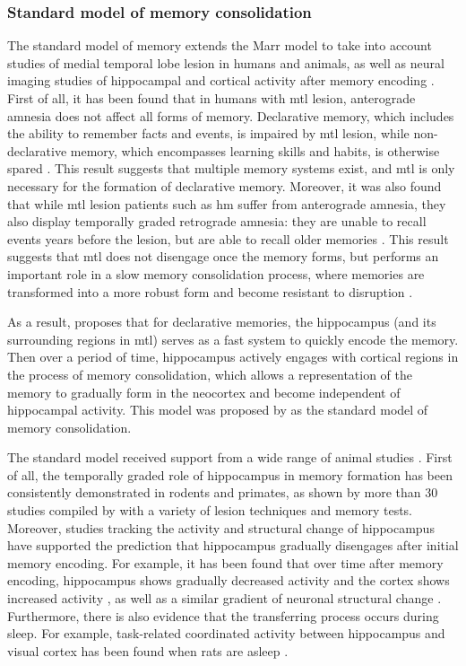 \subsubsection{Standard model of memory consolidation \label{hpc-squire}}
The standard model of memory extends the Marr model to take into account studies of medial temporal lobe lesion in humans and animals, as well as neural imaging studies of hippocampal and cortical activity after memory encoding \citep{squire92, squire09}. First of all, it has been found that in humans with \gls{mtl} lesion, anterograde amnesia does not affect all forms of memory. Declarative memory, which includes the ability to remember facts and events, is impaired by \gls{mtl} lesion, while non-declarative memory, which encompasses learning skills and habits, is otherwise spared \citep{cohen80, squire04}. This result suggests that multiple memory systems exist, and \gls{mtl} is only necessary for the formation of declarative memory. Moreover, it was also found that while \gls{mtl} lesion patients such as \gls{hm} suffer from anterograde amnesia, they also display temporally graded retrograde amnesia: they are unable to recall events years before the lesion, but are able to recall older memories \citep{marslen-wilson75}. This result suggests that \gls{mtl} does not disengage once the memory forms, but performs an important role in a slow memory consolidation process, where memories are transformed into a more robust form and become resistant to disruption \citep{squire92}. 

As a result, \citet{squire92} proposes that for declarative memories, the hippocampus (and its surrounding regions in \gls{mtl}) serves as a fast system to quickly encode the memory. Then over a period of time, hippocampus actively engages with cortical regions in the process of memory consolidation, which allows a representation of the memory to gradually form in the neocortex and become independent of hippocampal activity. This model was proposed by \citet{squire92} as the standard model of memory consolidation. 

The standard model received support from a wide range of animal studies \citep{squire09}. First of all, the temporally graded role of hippocampus in memory formation has been consistently demonstrated in rodents and primates, as shown by more than 30 studies compiled by \citet{frankland05} with a variety of lesion techniques and memory tests. Moreover, studies tracking the activity and structural change of hippocampus have supported the prediction that hippocampus gradually disengages after initial memory encoding. For example, it has been found that over time after memory encoding, hippocampus shows gradually decreased activity and the cortex shows increased activity \citep[e.g.,][]{bontempi99, frankland04a, takehara-nishiuchi06}, as well as a similar gradient of neuronal structural change \citep[e.g.][]{routtenberg00, maviel04, restivo09}. Furthermore, there is also evidence that the transferring process occurs during sleep. For example, task-related coordinated activity between hippocampus and visual cortex has been found when rats are asleep \citep{ji07}. 

